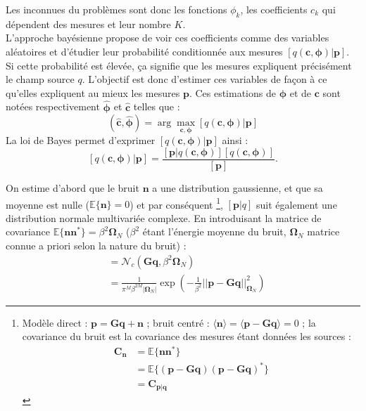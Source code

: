 Les inconnues du problèmes sont donc les fonctions $\phi_k$, les coefficients $c_k$ qui dépendent des mesures et leur nombre $K$.\\

L'approche bayésienne propose de voir ces coefficients comme des variables aléatoires et d'étudier leur probabilité conditionnée aux mesures $[q(\bm{c},\bm{\phi})|\bm{p}]$. Si cette probabilité est élevée, ça signifie que les mesures expliquent précisément le champ source $q$. L'objectif est donc d'estimer ces variables de façon à ce qu'elles expliquent au mieux les mesures $\bm{p}$. Ces estimations de $\bm{\phi}$ et de $\bm{c}$ sont notées respectivement $\bm{\hat{\phi}}$ et $\bm{\hat{c}}$ telles que : 
\begin{equation}
	(\bm{\hat{c}},\bm{\hat{\phi}}) = \arg\max_{\bm{c},\bm{\phi}}[q(\bm{c},\bm{\phi})|\bm{p}]
\end{equation}
La loi de Bayes permet d'exprimer $[q(\bm{c},\bm{\phi})|\bm{p}]$ ainsi : 
\begin{equation}
\label{bayes}
[q(\bm{c},\bm{\phi})|\bm{p}]=\frac{[\bm{p}|q(\bm{c},\bm{\phi})][q(\bm{c},\bm{\phi})]}{[\bm{p}]}.
\end{equation}



On estime d'abord que le bruit $\bm{n}$  a une distribution gaussienne, et que sa moyenne est nulle ($\mathbb{E}\{\bm{n}\}=0$) et par conséquent 
\footnote{Modèle direct : $\bm{p}=\bm{Gq}+\bm{n}$ ; bruit centré : $\langle \bm{n}\rangle = \langle \bm{p}-\bm{Gq} \rangle = 0 $ ; la covariance du bruit est la covariance des mesures étant données les sources : 
\begin{align*}
\bm{C_n}& =  \mathbb{E}\{\bm{n}\bm{n}^*\} \\
		& =  \mathbb{E}\{(\bm{p}-\bm{Gq})(\bm{p}-\bm{Gq})^*\}  \\
		& =  \bm{C_{\bm{p}|\bm{q}}} 
\end{align*}
},
$[\bm{p}|q]$ suit également une distribution normale multivariée complexe. En introduisant la matrice de covariance $\mathbb{E}\{\bm{n}\bm{n}^*\}=\beta^{2}\bm{\Omega}_N$ ($\beta^2$ étant l'énergie moyenne du bruit, $\bm{\Omega}_N$ matrice connue a priori selon la nature du bruit) : 
\begin{align}
[\bm{p}|q,\beta^2] &=\mathcal{N}_c(\bm{G}\bm{q},\beta^2\bm{\Omega}_N) \\
	&= \frac{   1   }{ \pi^M \beta^{2M} |\bm{\Omega}_N| } \exp \left( -\frac{1}{\beta^2} ||   \bm{p}  -  \bm{Gq}  ||^2_{\bm{\Omega}_N} \right)
\end{align}

